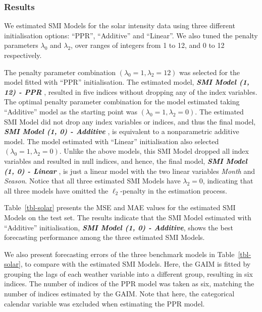 \documentclass[
  11pt,
  a4paper,
]{article}
\begin{document}
\subsubsection{Results}\label{results-1}

We estimated SMI Models for the solar intensity data using three
different initialisation options: ``PPR'', ``Additive'' and ``Linear''.
We also tuned the penalty parameters \(\lambda_{0}\) and
\(\lambda_{2}\), over ranges of integers from 1 to 12, and 0 to 12
respectively.

The penalty parameter combination
\((\lambda_{0} = 1, \lambda_{2} = 12)\) was selected for the model
fitted with ``PPR'' initialisation. The estimated model,
\textbf{\emph{SMI Model (1, 12) - PPR }}, resulted in five indices
without dropping any of the index variables. The optimal penalty
parameter combination for the model estimated taking ``Additive'' model
as the starting point was \((\lambda_{0} = 1, \lambda_{2} = 0)\). The
estimated SMI Model did not drop any index variables or indices, and
thus the final model, \textbf{\emph{SMI Model (1, 0) - Additive }}, is
equivalent to a nonparametric additive model. The model estimated with
``Linear'' initialisation also selected
\((\lambda_{0} = 1, \lambda_{2} = 0)\). Unlike the above models, this
SMI Model dropped all index variables and resulted in null indices, and
hence, the final model, \textbf{\emph{SMI Model (1, 0) - Linear }}, is
just a linear model with the two linear variables \emph{Month} and
\emph{Season}. Notice that all three estimated SMI Models have
\(\lambda_{2} = 0\), indicating that all three models have omitted the
\(\ell_{2}\)-penalty in the estimation process.

Table~\ref{tbl-solar} presents the MSE and MAE values for the estimated
SMI Models on the test set. The results indicate that the SMI Model
estimated with ``Additive'' initialisation, \textbf{\emph{SMI Model (1,
0) - Additive}}, shows the best forecasting performance among the three
estimated SMI Models.

We also present forecasting errors of the three benchmark models in
Table~\ref{tbl-solar}, to compare with the estimated SMI Models. Here,
the GAIM is fitted by grouping the lags of each weather variable into a
different group, resulting in six indices. The number of indices of the
PPR model was taken as six, matching the number of indices estimated by
the GAIM. Note that here, the categorical calendar variable was excluded
when estimating the PPR model.
\end{document}
